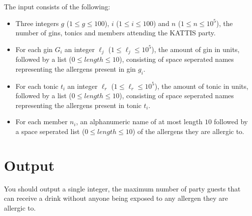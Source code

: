 The input consists of the following:

\begin{itemize}
\item Three integers $g$ ($1 \leq g \leq 100$), $i$ ($1 \leq i \leq 100$) and $n$ ($1 \leq n \leq 10^5$), the number of gins, tonics and members attending the KATTIS party.

\item For each gin $G_i$ an integer $\ell_j$ ($1 \leq \ell_j \leq10^5$), the amount of gin in units, followed by a list ($0 \leq length \leq 10$), consisting of space seperated names representing the allergens present in gin $g_i$.

\item For each tonic $t_i$ an integer $\ell_r$ ($1 \leq \ell_r \leq 10^5$), the amount of tonic in units, followed by a list ($0 \leq length \leq 10$), consisting of space seperated names representing the allergens present in tonic $t_i$.

\item For each member $n_i$, an alphanumeric name of at most length $10$ followed by a space seperated list ($0 \leq length \leq 10$) of the allergens they are allergic to.
\end{itemize}

\section*{Output}

You should output a single integer, the maximum number of party guests that can receive a drink without anyone being exposed to any allergen they are allergic to.